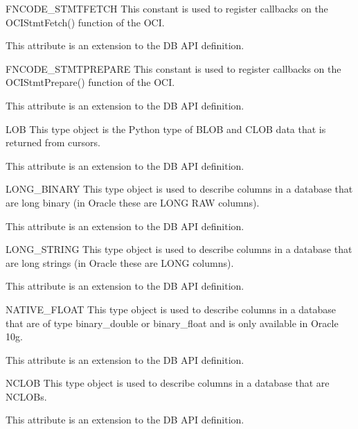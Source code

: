 \documentclass{manual}
\begin{document}
\begin{datadesc}{FNCODE_STMTFETCH}
  This constant is used to register callbacks on the OCIStmtFetch() function
  of the OCI.

   This attribute is an extension to the DB API definition.
\end{datadesc}

\begin{datadesc}{FNCODE_STMTPREPARE}
  This constant is used to register callbacks on the OCIStmtPrepare() function
  of the OCI.

   This attribute is an extension to the DB API definition.
\end{datadesc}

\begin{datadesc}{LOB}
  This type object is the Python type of BLOB and CLOB data that is returned
  from cursors.

   This attribute is an extension to the DB API definition.
\end{datadesc}

\begin{datadesc}{LONG_BINARY}
  This type object is used to describe columns in a database that are long
  binary (in Oracle these are LONG RAW columns).

   This attribute is an extension to the DB API definition.
\end{datadesc}

\begin{datadesc}{LONG_STRING}
  This type object is used to describe columns in a database that are long
  strings (in Oracle these are LONG columns).

   This attribute is an extension to the DB API definition.
\end{datadesc}

\begin{datadesc}{NATIVE_FLOAT}
  This type object is used to describe columns in a database that are of type
  binary_double or binary_float and is only available in Oracle 10g.

   This attribute is an extension to the DB API definition.
\end{datadesc}

\begin{datadesc}{NCLOB}
  This type object is used to describe columns in a database that are NCLOBs.

   This attribute is an extension to the DB API definition.
\end{datadesc}
\end{document}

